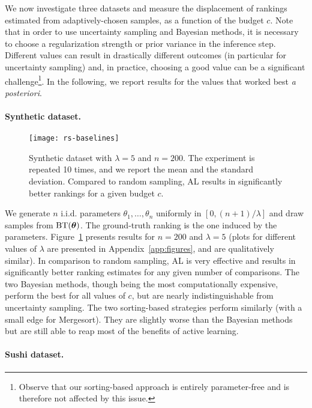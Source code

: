 We now investigate three datasets and measure the displacement of rankings estimated from adaptively-chosen samples, as a function of the budget $c$.
Note that in order to use uncertainty sampling and Bayesian methods, it is necessary to choose a regularization strength or prior variance in the inference step.
Different values can result in drastically different outcomes (in particular for uncertainty sampling) and, in practice, choosing a good value can be a significant challenge\footnote{Observe that our sorting-based approach is entirely parameter-free and is therefore not affected by this issue.}.
In the following, we report results for the values that worked best \emph{a posteriori}.


\paragraph{Synthetic dataset.}

\begin{figure}[t]
\centering
\texttt{[image: rs-baselines]}
\caption{
Synthetic dataset with $\lambda = 5$ and $n = 200$.
The experiment is repeated \num{10} times, and we report the mean and the standard deviation.
Compared to random sampling, AL results in significantly better rankings for a given budget $c$.
}
\label{fig:baselines}
\end{figure}

We generate $n$ i.i.d. parameters $\theta_1, \ldots, \theta_n$ uniformly in $[0, (n+1) / \lambda]$ and draw samples from $\operatorname{BT}(\bm{\theta})$.
The ground-truth ranking is the one induced by the parameters.
Figure~\ref{fig:baselines} presents results for $n = \num{200}$ and $\lambda = \num{5}$ (plots for different values of $\lambda$ are presented in Appendix~\ref{app:figures}, and are qualitatively similar).
In comparison to random sampling, AL is very effective and results in significantly better ranking estimates for any given number of comparisons.
The two Bayesian methods, though being the most computationally expensive, perform the best for all values of $c$, but are nearly indistinguishable from uncertainty sampling.
The two sorting-based strategies perform similarly (with a small edge for Mergesort).
They are slightly worse than the Bayesian methods but are still able to reap most of the benefits of active learning.


\paragraph{Sushi dataset.}

